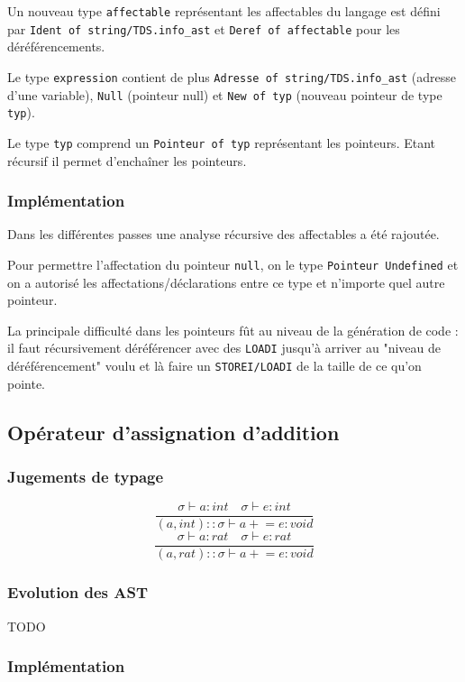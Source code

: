 \documentclass[headings=standardclasses,parskip=half]{scrartcl}
\begin{document}
Un nouveau type \texttt{affectable} représentant les affectables du
langage est défini par \texttt{Ident of string/TDS.info\_ast} et
\texttt{Deref of affectable} pour les déréférencements.

Le type \texttt{expression} contient de plus
\texttt{Adresse of string/TDS.info\_ast} (adresse d'une variable),
\texttt{Null} (pointeur null) et \texttt{New of typ} (nouveau pointeur
de type \texttt{typ}).

Le type \texttt{typ} comprend un \texttt{Pointeur of typ} représentant
les pointeurs. Etant récursif il permet d'enchaîner les pointeurs.

\subsubsection*{Implémentation}

Dans les différentes passes une analyse récursive des affectables
a été rajoutée.

Pour permettre l'affectation du pointeur \texttt{null},
on le type \texttt{Pointeur Undefined}
et on a autorisé les affectations/déclarations entre ce type
et n'importe quel autre pointeur.

La principale difficulté dans les pointeurs fût au niveau de
la génération de code : il faut récursivement déréférencer avec des
\texttt{LOADI} jusqu'à arriver au "niveau de déréférencement" voulu
et là faire un \texttt{STOREI/LOADI} de la taille de ce qu'on pointe.

\subsection{Opérateur d'assignation d'addition}

\subsubsection*{Jugements de typage}

\[\frac{\sigma \vdash a : int \quad \sigma \vdash e : int}
    {(a,int)::\sigma \vdash a \mathrel{+}= e : void}\]
\[\frac{\sigma \vdash a : rat \quad \sigma \vdash e : rat}
    {(a,rat)::\sigma \vdash a \mathrel{+}= e : void}\]

\subsubsection*{Evolution des AST}

TODO

\subsubsection*{Implémentation}
\end{document}
